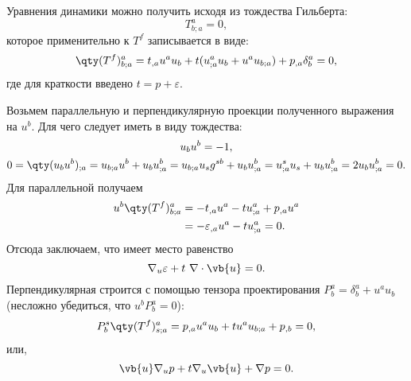 \documentclass[\docroot/reports/draft/report.tex]{subfiles}
\begin{document}
    Уравнения динамики можно получить исходя из тождества Гильберта:
    \begin{equation}
        T^a_{b;a} = 0 ,
    \end{equation}
    которое применительно к $T^f$ записывается в виде:
    \begin{equation*}
        \qty(T^f)^a_{b;a} = t_{,a} u^a u_b + t (u^a_{;a} u_b + u^a u_{b;a}) + p_{,a} \delta^a_b = 0,
    \end{equation*}
    где для краткости введено $t = p + \varepsilon$.

    Возьмем параллельную и перпендикулярную проекции полученного выражения на $u^b$. Для чего следует иметь в виду тождества:
    \begin{gather*}
        u_b u^b = -1 , \\
        0 = \qty(u_b u^b)_{;a} = u_{b;a} u^b + u_b u^b_{;a}
          = u_{b;a} u_s g^{sb} + u_b u^b_{;a}
          = u^s_{;a} u_s + u_b u^b_{;a}
          = 2 u_b u^b_{;a}
          = 0 .
    \end{gather*}
    Для параллельной получаем
    \begin{equation*}\begin{aligned}
        u^b \qty(T^f)^a_{b;a} &= - t_{,a} u^a - t u^a_{;a} + p_{,a} u^a \\
                              &= - \varepsilon_{,a} u^a - t u^a_{;a} = 0 .
    \end{aligned}\end{equation*}
    Отсюда заключаем, что имеет место равенство
    \begin{equation}
        \nabla_u \varepsilon + t\ \nabla \cdot \vb{u} = 0 .
    \end{equation}
    Перпендикулярная строится с помощью тензора проектирования $P^a_b = \delta^a_b + u^a u_b$ (несложно убедиться, что $u^b P^a_b = 0$):
    \begin{equation*}\begin{aligned}
        P^s_b \qty(T^f)^a_{s;a} = p_{,a} u^a u_b + t u^a u_{b;a} + p_{,b} = 0 ,
    \end{aligned}\end{equation*}
    или,
    \begin{equation}
        \vb{u} \nabla_u p + t \nabla_u \vb{u} + \nabla p = 0 .
    \end{equation}

    \vspace{1cm}
\end{document}
